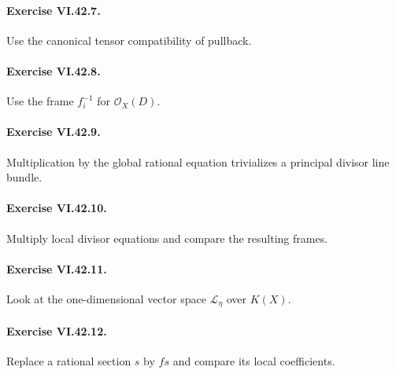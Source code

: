 \paragraph{Exercise VI.42.7.}
\begin{hint}
Use the canonical tensor compatibility of pullback.
\end{hint}

\paragraph{Exercise VI.42.8.}
\begin{hint}
Use the frame \(f_i^{-1}\) for \(\mathcal O_X(D)\).
\end{hint}

\paragraph{Exercise VI.42.9.}
\begin{hint}
Multiplication by the global rational equation trivializes a principal divisor line bundle.
\end{hint}

\paragraph{Exercise VI.42.10.}
\begin{hint}
Multiply local divisor equations and compare the resulting frames.
\end{hint}

\paragraph{Exercise VI.42.11.}
\begin{hint}
Look at the one-dimensional vector space \(\mathcal L_\eta\) over \(K(X)\).
\end{hint}

\paragraph{Exercise VI.42.12.}
\begin{hint}
Replace a rational section \(s\) by \(fs\) and compare its local coefficients.
\end{hint}

